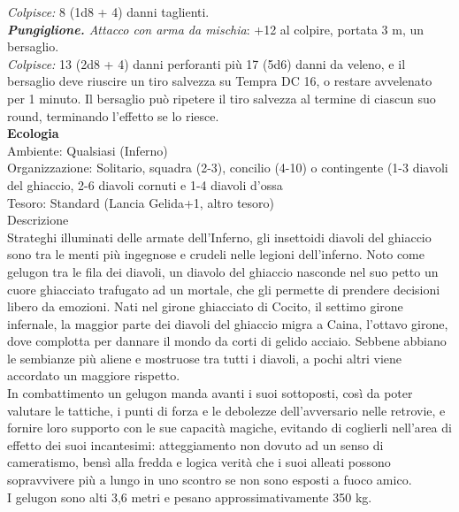 \begin{multicols}{2}
\emph{Colpisce:} 8 (1d8 + 4) danni taglienti.\\
\emph{\textbf{Pungiglione.} Attacco con arma da mischia}: +12 al colpire, portata 3 m, un bersaglio.\\
\emph{Colpisce:} 13 (2d8 + 4) danni perforanti più 17 (5d6) danni da veleno, e il bersaglio deve riuscire un tiro salvezza su Tempra DC  16, o restare avvelenato per 1 minuto. Il bersaglio può ripetere il tiro salvezza al termine di ciascun suo round, terminando l'effetto se lo riesce.\\
\textbf{Ecologia}\\
Ambiente: Qualsiasi (Inferno)\\
Organizzazione: Solitario, squadra (2-3), concilio (4-10) o contingente (1-3 diavoli del ghiaccio, 2-6 diavoli cornuti e 1-4 diavoli d'ossa\\
Tesoro: Standard (Lancia Gelida+1, altro tesoro)\\
Descrizione\\
Strateghi illuminati delle armate dell’Inferno, gli insettoidi diavoli del ghiaccio sono tra le menti più ingegnose e crudeli nelle legioni dell'inferno. Noto come gelugon tra le fila dei diavoli, un diavolo del ghiaccio nasconde nel suo petto un cuore ghiacciato trafugato ad un mortale, che gli permette di prendere decisioni libero da emozioni. Nati nel girone ghiacciato di Cocito, il settimo girone infernale, la maggior parte dei diavoli del ghiaccio migra a Caina, l’ottavo girone, dove complotta per dannare il mondo da corti di gelido acciaio. Sebbene abbiano le sembianze più aliene e mostruose tra tutti i diavoli, a pochi altri viene accordato un maggiore rispetto.\\
In combattimento un gelugon manda avanti i suoi sottoposti, così da poter valutare le tattiche, i punti di forza e le debolezze dell’avversario nelle retrovie, e fornire loro supporto con le sue capacità magiche, evitando di coglierli nell'area di effetto dei suoi incantesimi: atteggiamento non dovuto ad un senso di cameratismo, bensì alla fredda e logica verità che i suoi alleati possono sopravvivere più a lungo in uno scontro se non sono esposti a fuoco amico.\\
I gelugon sono alti 3,6 metri e pesano approssimativamente 350 kg.\\


\end{multicols}
